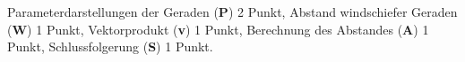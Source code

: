 \begin{loesung}
\end{loesung}

\begin{bewertung}
Parameterdarstellungen der Geraden ({\bf P}) 2 Punkt,
Abstand windschiefer Geraden ({\bf W}) 1 Punkt,
Vektorprodukt ({\bf v}) 1 Punkt,
Berechnung des Abstandes ({\bf A}) 1 Punkt,
Schlussfolgerung ({\bf S}) 1 Punkt.
\end{bewertung}

